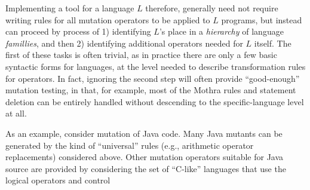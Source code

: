 \documentclass[sigconf,review, anonymous]{acmart}
\begin{document}
Implementing a tool for a language $L$ therefore, generally need not
require writing rules for all mutation operators to be applied to $L$
programs, but instead can proceed by process of 1) identifying $L$'s
place in a \emph{hierarchy} of language \emph{famillies}, and then 2)
identifying additional operators needed for $L$ itself.  The first of
these tasks is often trivial, as in practice there are only a few
basic syntactic forms for languages, at the level needed to describe
transformation rules for operators.  In fact, ignoring the second step
will often provide ``good-enough'' mutation testing, in that, for
example, most of the Mothra rules and statement deletion can be
entirely handled without descending to the specific-language level at all.

As an
example, consider mutation of Java code.  Many Java mutants can be
generated by the kind of ``universal'' rules (e.g., arithmetic
operator replacements) considered above.  Other mutation operators
suitable for Java source are provided by considering the set of
``C-like'' languages that use the logical operators and control
\end{document}
